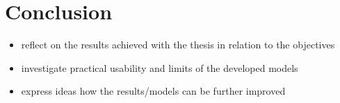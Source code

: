 \section{Conclusion}
\begin{itemize}
    \item reflect on the results achieved with the thesis in relation to the objectives
    \item investigate practical usability and limits of the developed models
    \item express ideas how the results/models can be further improved
\end{itemize}

\newpage